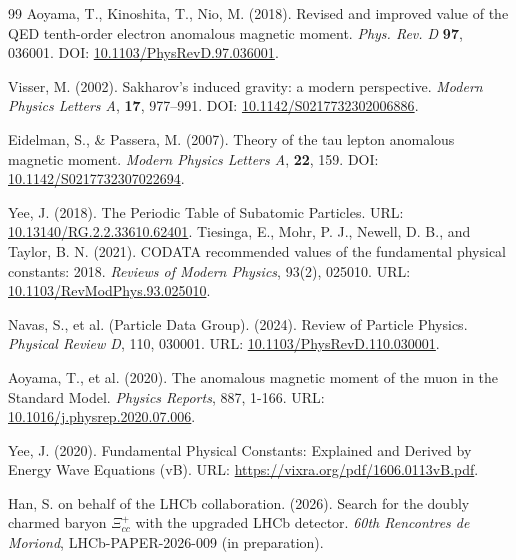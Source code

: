 \documentclass[10pt,a4paper]{article}
\begin{document}
\begin{thebibliography}{99}
	Aoyama, T., Kinoshita, T., Nio, M. (2018).
	Revised and improved value of the QED tenth-order electron anomalous magnetic moment.
	\textit{Phys. Rev. D} \textbf{97}, 036001.
	DOI: \href{https://doi.org/10.1103/PhysRevD.97.036001}{10.1103/PhysRevD.97.036001}.
	
	Visser, M. (2002).
	Sakharov's induced gravity: a modern perspective.
	\textit{Modern Physics Letters A}, \textbf{17}, 977–991.
	DOI: \href{https://doi.org/10.1142/S0217732302006886}{10.1142/S0217732302006886}.
	
	Eidelman, S., \& Passera, M. (2007).
	Theory of the tau lepton anomalous magnetic moment.
	\textit{Modern Physics Letters A}, \textbf{22}, 159.
	DOI: \href{https://doi.org/10.1142/S0217732307022694}{10.1142/S0217732307022694}.
	
	Yee, J. (2018).
	The Periodic Table of Subatomic Particles.
	URL: \href{https://doi.org/10.13140/RG.2.2.33610.62401}{10.13140/RG.2.2.33610.62401}.
	Tiesinga, E., Mohr, P. J., Newell, D. B., and Taylor, B. N. (2021).
	CODATA recommended values of the fundamental physical constants: 2018.
	\textit{Reviews of Modern Physics}, 93(2), 025010.
	URL: \href{https://doi.org/10.1103/RevModPhys.93.025010}{10.1103/RevModPhys.93.025010}.

	Navas, S., et al. (Particle Data Group). (2024).
	Review of Particle Physics.
	\textit{Physical Review D}, 110, 030001.
	URL: \href{https://doi.org/10.1103/PhysRevD.110.030001}{10.1103/PhysRevD.110.030001}.

	Aoyama, T., et al. (2020).
	The anomalous magnetic moment of the muon in the Standard Model.
	\textit{Physics Reports}, 887, 1-166.
	URL: \href{https://doi.org/10.1016/j.physrep.2020.07.006}{10.1016/j.physrep.2020.07.006}.
	
	Yee, J. (2020). 
	Fundamental Physical Constants: Explained and Derived by Energy Wave Equations (vB).
	URL: \href{https://vixra.org/pdf/1606.0113vB.pdf}{https://vixra.org/pdf/1606.0113vB.pdf}.
	
	Han, S. on behalf of the LHCb collaboration. (2026). 
	Search for the doubly charmed baryon $\Xi_{cc}^+$ with 
	the upgraded LHCb detector. \textit{60th Rencontres de 
		Moriond}, LHCb-PAPER-2026-009 (in preparation).
	

\end{thebibliography}
\end{document}
